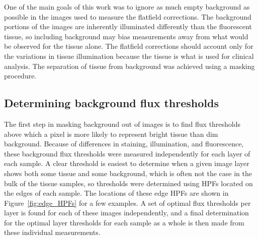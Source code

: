 \documentclass[letterpaper,11pt]{article}
\newcommand{\reffig}[1]{Figure~\ref{#1}}
\begin{document}
One of the main goals of this work was to ignore as much empty background as possible in the images used to measure the flatfield corrections. The background portions of the images are inherently illuminated differently than the fluorescent tissue, so including background may bias measurements away from what would be observed for the tissue alone. The flatfield corrections should account only for the variations in tissue illumination because the tissue is what is used for clinical analysis. The separation of tissue from background was achieved using a masking procedure.

\subsection{Determining background flux thresholds}
\label{ssec:determining_background_flux_thresholds}

The first step in masking background out of images is to find flux thresholds above which a pixel is more likely to represent bright tissue than dim background. Because of differences in staining, illumination, and fluorescence, these background flux thresholds were measured independently for each layer of each sample. A clear threshold is easiest to determine when a given image layer shows both some tissue and some background, which is often not the case in the bulk of the tissue samples, so thresholds were determined using HPFs located on the edges of each sample. The locations of these edge HPFs are shown in \reffig{fig:edge_HPFs} for a few examples. A set of optimal flux thresholds per layer is found for each of these images independently, and a final determination for the optimal layer thresholds for each sample as a whole is then made from these individual measurements.
\end{document}
